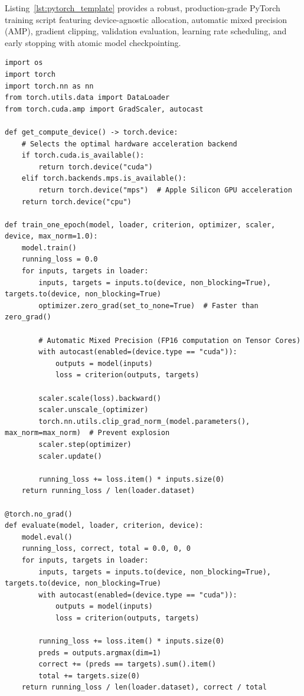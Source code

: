 Listing~\ref{lst:pytorch_template} provides a robust, production-grade PyTorch training script featuring device-agnostic allocation, automatic mixed precision (AMP), gradient clipping, validation evaluation, learning rate scheduling, and early stopping with atomic model checkpointing.

\begin{lstlisting}[style=pythonstyle, caption={Production-Grade PyTorch Training Pipeline Template.}, label={lst:pytorch_template}]
import os
import torch
import torch.nn as nn
from torch.utils.data import DataLoader
from torch.cuda.amp import GradScaler, autocast

def get_compute_device() -> torch.device:
    # Selects the optimal hardware acceleration backend
    if torch.cuda.is_available():
        return torch.device("cuda")
    elif torch.backends.mps.is_available():
        return torch.device("mps")  # Apple Silicon GPU acceleration
    return torch.device("cpu")

def train_one_epoch(model, loader, criterion, optimizer, scaler, device, max_norm=1.0):
    model.train()
    running_loss = 0.0
    for inputs, targets in loader:
        inputs, targets = inputs.to(device, non_blocking=True), targets.to(device, non_blocking=True)
        optimizer.zero_grad(set_to_none=True)  # Faster than zero_grad()

        # Automatic Mixed Precision (FP16 computation on Tensor Cores)
        with autocast(enabled=(device.type == "cuda")):
            outputs = model(inputs)
            loss = criterion(outputs, targets)

        scaler.scale(loss).backward()
        scaler.unscale_(optimizer)
        torch.nn.utils.clip_grad_norm_(model.parameters(), max_norm=max_norm)  # Prevent explosion
        scaler.step(optimizer)
        scaler.update()

        running_loss += loss.item() * inputs.size(0)
    return running_loss / len(loader.dataset)

@torch.no_grad()
def evaluate(model, loader, criterion, device):
    model.eval()
    running_loss, correct, total = 0.0, 0, 0
    for inputs, targets in loader:
        inputs, targets = inputs.to(device, non_blocking=True), targets.to(device, non_blocking=True)
        with autocast(enabled=(device.type == "cuda")):
            outputs = model(inputs)
            loss = criterion(outputs, targets)

        running_loss += loss.item() * inputs.size(0)
        preds = outputs.argmax(dim=1)
        correct += (preds == targets).sum().item()
        total += targets.size(0)
    return running_loss / len(loader.dataset), correct / total


\end{lstlisting}
